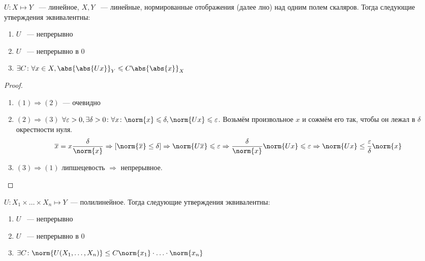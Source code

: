\begin{theorem}
    $U\colon X\mapsto Y$ ~--- линейное, $X,Y$ ~--- линейные,
    нормированные отображения (далее лно)
    над одним полем скаляров.
    Тогда следующие утверждения эквивалентны:
    \begin{enumerate}
        \item$U$ ~--- непрерывно
        \item $U$ ~--- непрерывно в 0
        \item $\exists C\colon \forall x\in X, \abs{\abs{Ux}}_Y\leqslant C\abs{\abs{x}}_X$
    \end{enumerate}
\end{theorem}
\newpage
\begin{proof}
    \begin{enumerate}
        \item $(1)\Rightarrow (2)$~--- очевидно
        \item  $(2)\Rightarrow (3)$
             $\forall \varepsilon > 0, \exists \delta > 0\colon
             \forall x\colon \norm{x} \leqslant \delta, \norm{Ux} \leqslant \varepsilon$.
             Возьмём произвольное $x$ и сожмём его так, чтобы он лежал 
             в $\delta$ окрестности нуля.
             \[
                 \overline{x} = x\frac{\delta}{\norm{x}} \Rightarrow
                 \left[\norm{\overline{x}} \le \delta\right] 
                 \Rightarrow \norm{U\overline{x}} \leqslant  \varepsilon
                 \Rightarrow \frac{\delta}{\norm{x}}\norm{Ux} \leqslant \varepsilon
                 \Rightarrow \norm{Ux} \le \frac{\varepsilon}{\delta} \norm{x}
             \]
         \item $(3)\Rightarrow(1)$
             липшецевость  $\Rightarrow$ непрерывное.
    \end{enumerate}
\end{proof}
\begin{theorem}
    $U\colon X_1\times\dots \times X_n\mapsto Y$~--- полилинейное.
    Тогда следующие утверждения эквивалентны:
    \begin{enumerate}
        \item
            $U$ ~--- непрерывно
        \item 
            $U$ ~--- непрерывно в 0
        \item
            $\exists C\colon \norm{U(X_1,\dots, X_n)} \leq
            C\norm{x_1}\cdot\ldots\cdot\norm{x_n}$
    \end{enumerate}
\end{theorem}
